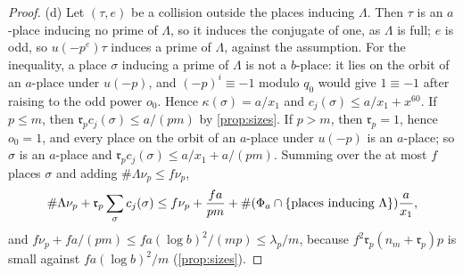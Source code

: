 \begin{proof}
(d) Let $(\tau,e)$ be a collision outside the places inducing $\Lambda$. Then $\tau$ is an $a$-place inducing no prime of $\Lambda$, so it induces the conjugate of one, as $\Lambda$ is full; $e$ is odd, so $u(-p^e)\tau$ induces a prime of $\Lambda$, against the assumption. For the inequality, a place $\sigma$ inducing a prime of $\Lambda$ is not a $b$-place: it lies on the orbit of an
$a$-place under $u(-p)$, and $(-p)^i\equiv-1$ modulo $q_0$ would give $1\equiv-1$ after raising to the odd power $o_0$. Hence $\kappa(\sigma)=a/x_1$ and $c_j(\sigma)\le a/x_1+x^{60}$. If $p\le m$, then $\mathfrak r_pc_j(\sigma)\le a/(pm)$ by \cref{prop:sizes}. If $p>m$, then $\mathfrak r_p=1$, hence $o_0=1$, and every place on the orbit of an $a$-place under $u(-p)$ is an
$a$-place; so $\sigma$ is an $a$-place and $\mathfrak r_pc_j(\sigma)\le a/x_1+a/(pm)$. Summing over the at most $f$ places $\sigma$ and adding $\#\Lambda\nu_p\le f\nu_p$,
\[
  \#\Lambda\nu_p+\mathfrak r_p\sum_\sigma c_j(\sigma)\le f\nu_p+\frac{fa}{pm}+\#(\Phi_a\cap\{\text{places inducing }\Lambda\})\frac a{x_1},
\]
and $f\nu_p+fa/(pm)\le fa(\log b)^2/(mp)\le\lambda_p/m$, because $f^2\mathfrak r_p(n_m+\mathfrak r_p)p$ is small against $fa(\log b)^2/m$ (\cref{prop:sizes}).
\end{proof}

